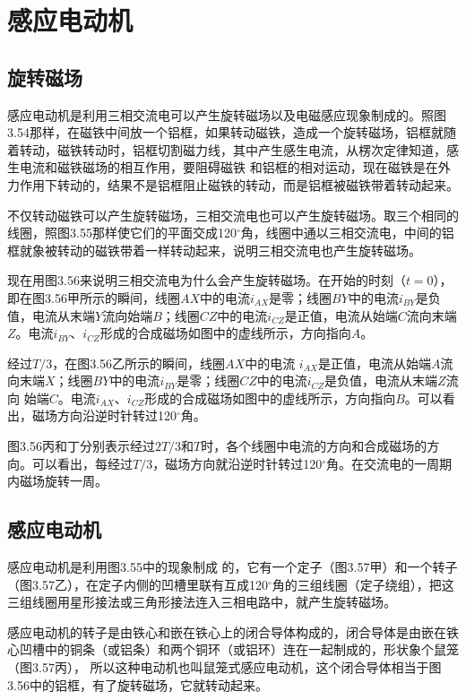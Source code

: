 \section{感应电动机}
\subsection{旋转磁场}

感应电动机是利用三相交流电可以产生旋转磁场以及电磁感应现象制成的。照图3.54那样，在磁铁中间放一个铝框，如果转动磁铁，造成一个旋转磁场，铝框就随着转动，磁铁转动时，铝框切割磁力线，其中产生感生电流，从楞次定律知道，感生电流和磁铁磁场的相互作用，要阻碍磁铁
和铝框的相对运动，现在磁铁是在外力作用下转动的，结果不是铝框阻止磁铁的转动，而是铝框被磁铁带着转动起来。

不仅转动磁铁可以产生旋转磁场，三相交流电也可以产生旋转磁场。取三个相同的线圈，照图3.55那样使它们的平面交成120$^\circ$角，线圈中通以三相交流电，中间的铝框就象被转动的磁铁带着一样转动起来，说明三相交流电也产生旋转磁场。

现在用图3.56来说明三相交流电为什么会产生旋转磁场。在开始的时刻（$t=0$），即在图3.56甲所示的瞬间，线圈$AX$中的电流$i_{AX}$是零；线圈$BY$中的电流$i_{BY}$是负值，电流从末端$Y$流向始端$B$；线圈$CZ$中的电流$i_{CZ}$是正值，电流从始端$C$流向末端$Z$。电流$i_{BY}$、$i_{CZ}$形成的合成磁场如图中的虚线所示，方向指向$A$。

经过$T/3$，在图3.56乙所示的瞬间，线圈$AX$中的电流
$i_{AX}$是正值，电流从始端$A$流向末端$X$；线圈$BY$中的电流$i_{BY}$是零；线圈$CZ$中的电流$i_{CZ}$是负值，电流从末端$Z$流向
始端$C$。电流$i_{AX}$、$i_{CZ}$形成的合成磁场如图中的虚线所示，方向指向$B$。可以看出，磁场方向沿逆时针转过120$^\circ$角。

图3.56丙和丁分别表示经过$2T/3$和$T$时，各个线圈中电流的方向和合成磁场的方向。可以看出，每经过$T/3$，磁场方向就沿逆时针转过120$^\circ$角。在交流电的一周期内磁场旋转一周。

\subsection{感应电动机}

感应电动机是利用图3.55中的现象制成
的，它有一个定子（图3.57甲）和一个转子（图3.57乙），在定子内侧的凹槽里联有互成120$^\circ$角的三组线圈（定子绕组），把这三组线圈用星形接法或三角形接法连入三相电路中，就产生旋转磁场。

感应电动机的转子是由铁心和嵌在铁心上的闭合导体构成的，闭合导体是由嵌在铁心凹槽中的铜条（或铝条）和两个铜环（或铝环）连在一起制成的，形状象个鼠笼（图3.57丙），
所以这种电动机也叫鼠笼式感应电动机，这个闭合导体相当于图3.56中的铝框，有了旋转磁场，它就转动起来。

